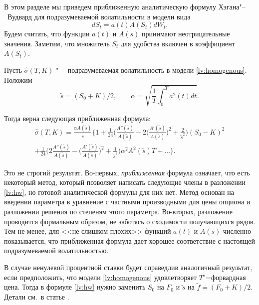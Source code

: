 В этом разделе мы приведем приближенную аналитическую формулу Хэгана"--~Вудвард \cite{HaganWoodward99} для подразумеваемой волатильности в модели вида
\begin{equation}
\label{lv:homogenous}
dS_t = a(t)A(S_t) dW_t.
\end{equation}
Будем считать, что  функции $a(t)$ и $A(s)$ принимают неотрицательные значения.
Заметим, что множитель $S_t$ для удобства включен в коэффициент $A(S_t)$.


\begin{theorem}
\label{lv:t:hagan-woodward}
Пусть $\hat\sigma(T,K)$ "--- подразумеваемая волатильность в модели \eqref{lv:homogenous}.
Положим 
\[
\tilde s = (S_0 + K)/2,\qquad
\alpha = \sqrt{\frac{1}{T}\int_0^T a^2(t)dt}.
\]

Тогда верна следующая приближенная формула:
\begin{multline}
\label{lv:hw}
\hat\sigma(T,K) = \frac{\alpha A(\tilde s)}{\tilde s} 
\biggl\{1 
+ \frac1{24} 
  \biggl(
    \frac{A''(\tilde s)}{A(\tilde s)} - 2\biggl(\frac{A'(\tilde s)}{A(\tilde s)}\biggr)^2 + \frac{2}{\tilde s^2}
  \biggr) (S_0-K)^2\\
+ \frac1{24}
  \biggl(
    2\frac{A''(\tilde s)}{A(\tilde s)} - \biggl(\frac{A'(\tilde s)}{A(\tilde s)}\biggr)^2 + \frac1{\tilde s^2}
  \biggr) \alpha^2 A^2(\tilde s)T + \ldots \biggr\}.
\end{multline}
\end{theorem}

\begin{remark}
Это не строгий результат.
Во-первых, \emph{приближенная} формула означает, что есть некоторый метод, который позволяет написать следующие члены в разложении \eqref{lv:hw}, но готовой аналитической формулы для них нет.
Метод основан на введении параметра в уравнение с частными производными для цены опциона и разложении решения по степеням этого параметра.
Во-вторых, разложение проводится формальным образом, не заботясь о сходимости получающихся рядов. Тем не менее, для <<не слишком плохих>> функций $a(t)$ и $A(s)$ численно показывается, что приближенная формула дает хорошее соответствие с настоящей подразумеваемой волатильностью.
\end{remark}

\begin{remark}
В случае ненулевой процентной ставки будет справедлив аналогичный результат, если предположить, что модели \eqref{lv:homogenous} удовлетворяет $T$"=форвардная цена.
Тогда в формуле \eqref{lv:hw} нужно заменить $S_0$ на $F_0$ и $\tilde s$ на $\tilde f = (F_0+K)/2$.
Детали см.~в статье \cite{HaganWoodward99}.
\end{remark}

